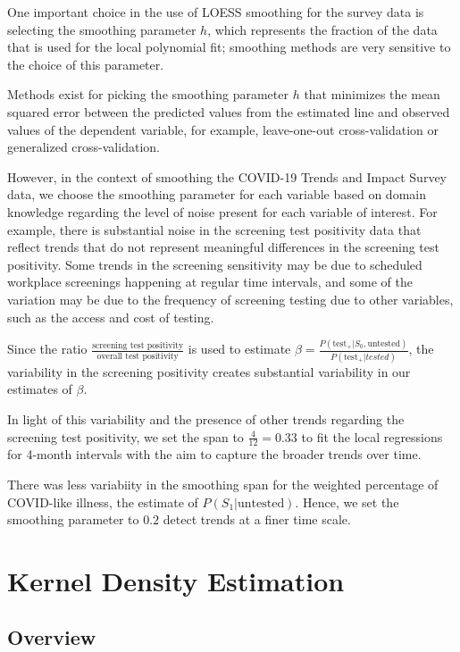 \documentclass[12pt,twoside]{smiththesis}
\begin{document}
One important choice in the use of LOESS smoothing for the survey data is selecting the smoothing parameter \(h\), which represents the fraction of the data that is used for the local polynomial fit; smoothing methods are very sensitive to the choice of this parameter.

Methods exist for picking the smoothing parameter \(h\) that minimizes the mean squared error between the predicted values from the estimated line and observed values of the dependent variable, for example, leave-one-out cross-validation or generalized cross-validation.

However, in the context of smoothing the COVID-19 Trends and Impact Survey data, we choose the smoothing parameter for each variable based on domain knowledge regarding the level of noise present for each variable of interest. For example, there is substantial noise in the screening test positivity data that reflect trends that do not represent meaningful differences in the screening test positivity. Some trends in the screening sensitivity may be due to scheduled workplace screenings happening at regular time intervals, and some of the variation may be due to the frequency of screening testing due to other variables, such as the access and cost of testing.

Since the ratio \(\frac{\text{screening test positivity}}{\text{overall test positivity}}\) is used to estimate \(\beta = \frac{P(\text{test}_+| S_0, \text{untested})}{P(\text{test}_+|tested)}\), the variability in the screening positivity creates substantial variability in our estimates of \(\beta\).

In light of this variability and the presence of other trends regarding the screening test positivity, we set the span to \(\frac{4}{12} = 0.33\) to fit the local regressions for 4-month intervals with the aim to capture the broader trends over time.

There was less variabiity in the smoothing span for the weighted percentage of COVID-like illness, the estimate of \(P(S_1|\text{untested})\). Hence, we set the smoothing parameter to \(0.2\) detect trends at a finer time scale.

\newpage

\hypertarget{kernel-density-estimation}{%
\section{Kernel Density Estimation}\label{kernel-density-estimation}}

\hypertarget{overview-2}{%
\subsection{Overview}\label{overview-2}}
\end{document}
